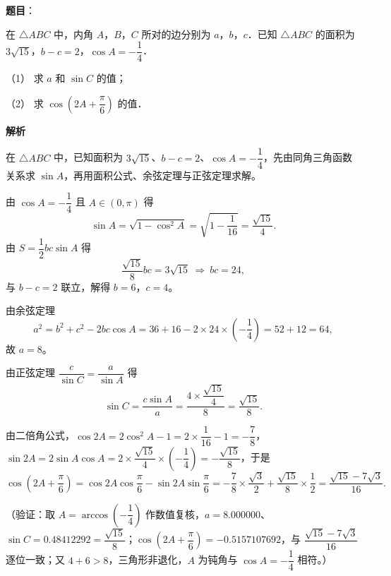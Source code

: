 \begin{answer}

\textbf{题目}：

在 \(\triangle ABC\) 中，内角 \(A\)，\(B\)，\(C\) 所对的边分别为 \(a\)，\(b\)，\(c\)．已知 \(\triangle ABC\) 的面积为 \(3\sqrt{15}\)，\(b-c=2\)，\(\cos A=-\dfrac{1}{4}\)．

（1） 求 \(a\) 和 \(\sin C\) 的值；

（2） 求 \(\cos\left(2A+\dfrac{\pi}{6}\right)\) 的值．

\textbf{解析}

在 \(\triangle ABC\) 中，已知面积为 \(3\sqrt{15}\)、\(b-c=2\)、\(\cos A=-\dfrac{1}{4}\)，先由同角三角函数关系求 \(\sin A\)，再用面积公式、余弦定理与正弦定理求解。

由 \(\cos A=-\dfrac{1}{4}\) 且 \(A\in(0,\pi)\) 得
\nopagebreak[4]
\[
\sin A=\sqrt{1-\cos^{2}A}=\sqrt{1-\dfrac{1}{16}}=\dfrac{\sqrt{15}}{4}.
\]
由 \(S=\dfrac{1}{2}bc\sin A\) 得
\nopagebreak[4]
\[
\dfrac{\sqrt{15}}{8}bc=3\sqrt{15}\ \Longrightarrow\ bc=24,
\]
与 \(b-c=2\) 联立，解得 \(b=6\)，\(c=4\)。

由余弦定理
\nopagebreak[4]
\[
a^{2}=b^{2}+c^{2}-2bc\cos A=36+16-2\times 24\times\left(-\dfrac{1}{4}\right)=52+12=64,
\]
故 \(a=8\)。

由正弦定理 \(\dfrac{c}{\sin C}=\dfrac{a}{\sin A}\) 得
\nopagebreak[4]
\[
\sin C=\dfrac{c\sin A}{a}=\dfrac{4\times\dfrac{\sqrt{15}}{4}}{8}=\dfrac{\sqrt{15}}{8}.
\]

由二倍角公式，\(\cos 2A=2\cos^{2}A-1=2\times\dfrac{1}{16}-1=-\dfrac{7}{8}\)，\(\sin 2A=2\sin A\cos A=2\times\dfrac{\sqrt{15}}{4}\times\left(-\dfrac{1}{4}\right)=-\dfrac{\sqrt{15}}{8}\)，于是
\nopagebreak[4]
\[
\cos\left(2A+\dfrac{\pi}{6}\right)=\cos 2A\cos\dfrac{\pi}{6}-\sin 2A\sin\dfrac{\pi}{6}=-\dfrac{7}{8}\times\dfrac{\sqrt{3}}{2}+\dfrac{\sqrt{15}}{8}\times\dfrac{1}{2}=\dfrac{\sqrt{15}-7\sqrt{3}}{16}.
\]

（验证：取 \(A=\arccos\left(-\dfrac{1}{4}\right)\) 作数值复核，\(a=8.000000\)、\(\sin C=0.48412292=\dfrac{\sqrt{15}}{8}\)；\(\cos\left(2A+\dfrac{\pi}{6}\right)=-0.5157107692\)，与 \(\dfrac{\sqrt{15}-7\sqrt{3}}{16}\) 逐位一致；又 \(4+6>8\)，三角形非退化，\(A\) 为钝角与 \(\cos A=-\dfrac{1}{4}\) 相符。）



\end{answer}
